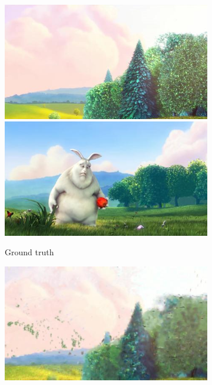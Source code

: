 \begin{figure}
	\centering
	\begin{subfigure}[t]{0.135\textwidth}
		\includegraphics[width=\textwidth]{figures/stereo/bbb_frame-0004-0}\\
		\includegraphics[width=\textwidth]{figures/stereo/bbb_frame-0092-0}
		\caption{Ground truth}
	\end{subfigure}
	\begin{subfigure}[t]{0.135\textwidth}
		\includegraphics[width=\textwidth]{figures/stereo/bbb_frame-0004-3}\\

\end{subfigure}
\end{figure}
